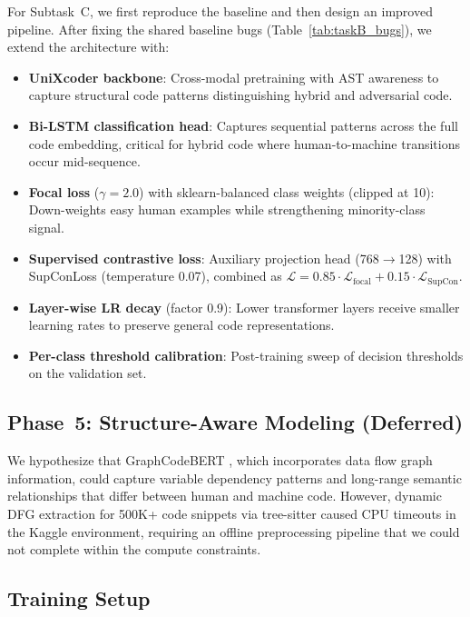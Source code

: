 \documentclass[11pt]{article}
\begin{document}
For Subtask~C, we first reproduce the baseline and then design an improved pipeline. After fixing the shared baseline bugs (Table~\ref{tab:taskB_bugs}), we extend the architecture with:
\begin{itemize}
    \item \textbf{UniXcoder backbone}: Cross-modal pretraining with AST awareness to capture structural code patterns distinguishing hybrid and adversarial code.
    \item \textbf{Bi-LSTM classification head}: Captures sequential patterns across the full code embedding, critical for hybrid code where human-to-machine transitions occur mid-sequence.
    \item \textbf{Focal loss} ($\gamma{=}2.0$) with sklearn-balanced class weights (clipped at 10): Down-weights easy human examples while strengthening minority-class signal.
    \item \textbf{Supervised contrastive loss}: Auxiliary projection head (768$\to$128) with SupConLoss (temperature 0.07), combined as $\mathcal{L} = 0.85 \cdot \mathcal{L}_{\text{focal}} + 0.15 \cdot \mathcal{L}_{\text{SupCon}}$.
    \item \textbf{Layer-wise LR decay} (factor 0.9): Lower transformer layers receive smaller learning rates to preserve general code representations.
    \item \textbf{Per-class threshold calibration}: Post-training sweep of decision thresholds on the validation set.
\end{itemize}

\subsection{Phase~5: Structure-Aware Modeling (Deferred)}

We hypothesize that GraphCodeBERT \cite{guo2021graphcodebert}, which incorporates data flow graph information, could capture variable dependency patterns and long-range semantic relationships that differ between human and machine code. However, dynamic DFG extraction for 500K+ code snippets via tree-sitter caused CPU timeouts in the Kaggle environment, requiring an offline preprocessing pipeline that we could not complete within the compute constraints.

\subsection{Training Setup}
\label{sec:training_setup}
\end{document}
